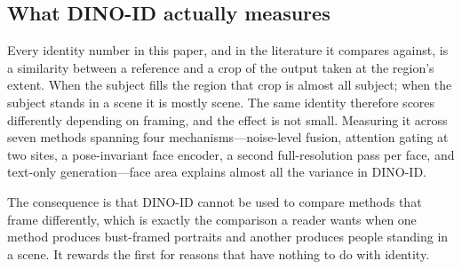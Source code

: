 \documentclass[10pt,twocolumn,letterpaper]{article}
\begin{document}
\subsection{What DINO-ID actually measures}
\label{sec:framing}

Every identity number in this paper, and in the literature it compares
against, is a similarity between a reference and a crop of the output taken
at the region's extent.  When the subject fills the region that crop is
almost all subject; when the subject stands in a scene it is mostly scene.
The same identity therefore scores differently depending on framing, and the
effect is not small.  Measuring it across seven methods spanning four
mechanisms---noise-level fusion, attention gating at two sites, a
pose-invariant face encoder, a second full-resolution pass per face, and
text-only generation---face area explains almost all the variance in
DINO-ID.

\begin{table}[htbp]
\centering
\caption{%
  \textbf{Identity score tracks how much of the frame the face occupies.}
  Face area is the detected face area as a fraction of the canvas.  All three
  columns are measured on the same 15 photographic human-human samples---the
  subset every method in the comparison could produce---so the rows are
  directly comparable.  Pearson $r$ between face area and DINO-ID is $0.949$.
  The method this paper reports scores highest on identity and renders the
  largest faces; text-only generation scores at chance and renders the
  smallest.%
}
\label{tab:framing}
\end{table}

The consequence is that DINO-ID cannot be used to compare methods that frame
differently, which is exactly the comparison a reader wants when one method
produces bust-framed portraits and another produces people standing in a
scene.  It rewards the first for reasons that have nothing to do with
identity.
\end{document}
